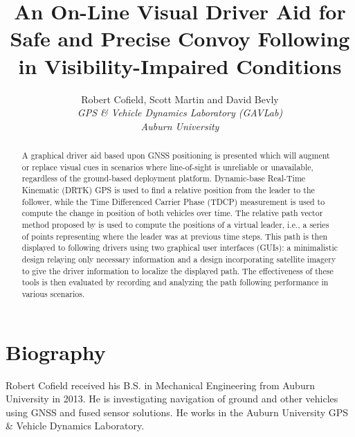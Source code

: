 \documentclass[twocolumn,10pt]{article}
\begin{document}

\title{\textbf{An On-Line Visual Driver Aid for Safe and Precise Convoy Following in Visibility-Impaired Conditions}}
\author{
  Robert Cofield, Scott Martin and David Bevly \\
  \em{GPS \& Vehicle Dynamics Laboratory (GAVLab)} \\
  \em{Auburn University} \\
}
\date{} %
\maketitle


\begin{abstract}

  A graphical driver aid based upon GNSS positioning is presented which will augment or replace visual cues in scenarios where line-of-sight is unreliable or unavailable, regardless of the ground-based deployment platform.
  Dynamic-base Real-Time Kinematic (DRTK) GPS is used to find a relative position from the leader to the follower, while the Time Differenced Carrier Phase (TDCP) measurement is used to compute the change in position of both vehicles over time.
  The relative path vector method proposed by \cite{travisdiss} is used to compute the positions of a virtual leader, i.e., a series of points representing where the leader was at previous time steps.
  This path is then displayed to following drivers using two graphical user interfaces (GUIs): a minimalistic design relaying only necessary information and a design incorporating satellite imagery to give the driver information to localize the displayed path.
  The effectiveness of these tools is then evaluated by recording and analyzing the path following performance in various scenarios.

\end{abstract}


\section*{Biography}

  Robert Cofield received his B.S. in Mechanical Engineering from Auburn University in 2013. He is investigating navigation of ground and other vehicles using GNSS and fused sensor solutions.  He works in the Auburn University GPS \& Vehicle Dynamics Laboratory.
\end{document}
